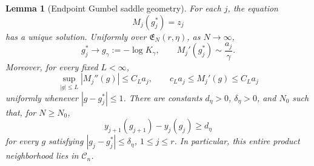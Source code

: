 \documentclass[11pt]{article}
\newtheorem{lemma}[theorem]{Lemma}
\theoremstyle{remark}
\begin{document}
\begin{lemma}[Endpoint Gumbel saddle geometry]
\label{lem:endpoint-gumbel-saddle}
For each \(j\), the equation
\[
        M_j(g_j^*)=z_j
\]
has a unique solution.  Uniformly over
\(\mathfrak E_N(r,\eta)\), as \(N\to\infty\),
\[
        g_j^*\longrightarrow g_\gamma:=-\log K_\gamma,
        \qquad
        M_j'(g_j^*)\sim\frac{a_j}{\gamma}.
\tag{8.6}\label{eq:endpoint-saddle-asymptotics}
\]
Moreover, for every fixed \(L<\infty\),
\[
        \sup_{|g|\le L}|M_j''(g)|\le C_La_j,
        \qquad
        c_La_j\le M_j'(g)\le C_La_j
\tag{8.7}\label{eq:endpoint-mean-derivative-bounds}
\]
uniformly whenever \(|g-g_j^*|\le1\).  There are constants
\(d_\eta>0\), \(\delta_\eta>0\), and \(N_0\) such that, for
\(N\ge N_0\),
\[
        y_{j+1}(g_{j+1})-y_j(g_j)\ge d_\eta
\tag{8.8}\label{eq:endpoint-threshold-gap}
\]
for every \(g\) satisfying
\(|g_j-g_j^*|\le\delta_\eta\), \(1\le j\le r\).  In particular, this
entire product neighborhood lies in \(\mathscr C_n\).
\end{lemma}
\end{document}
